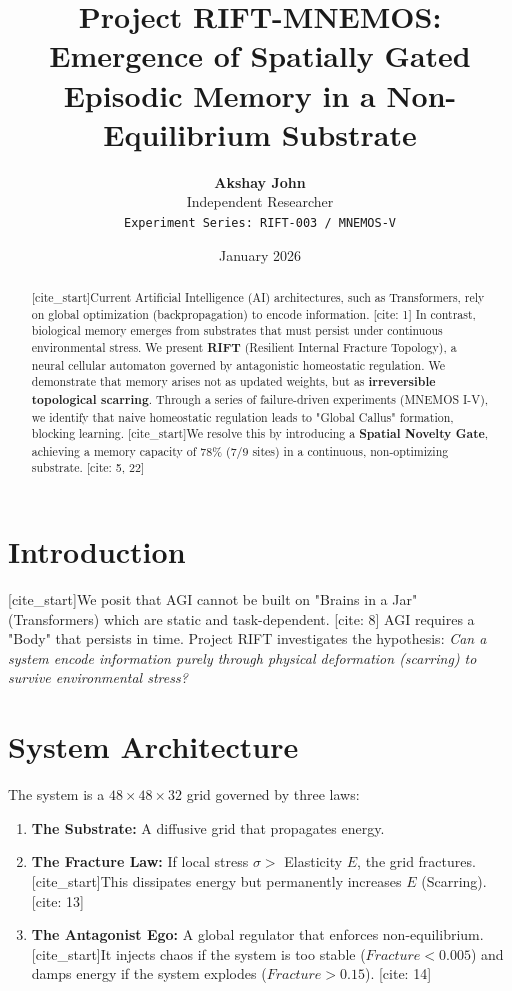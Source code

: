 \documentclass[11pt, a4paper]{article}
\title{\textbf{Project RIFT-MNEMOS:}\\
\large Emergence of Spatially Gated Episodic Memory in a Non-Equilibrium Substrate}
\author{
\textbf{Akshay John} \\
Independent Researcher \\
\texttt{Experiment Series: RIFT-003 / MNEMOS-V}
}
\date{January 2026}
\begin{document}
\maketitle

\begin{abstract}
[cite_start]Current Artificial Intelligence (AI) architectures, such as Transformers, rely on global optimization (backpropagation) to encode information. [cite: 1] In contrast, biological memory emerges from substrates that must persist under continuous environmental stress. We present \textbf{RIFT} (Resilient Internal Fracture Topology), a neural cellular automaton governed by antagonistic homeostatic regulation. We demonstrate that memory arises not as updated weights, but as \textbf{irreversible topological scarring}. Through a series of failure-driven experiments (MNEMOS I-V), we identify that naive homeostatic regulation leads to "Global Callus" formation, blocking learning. [cite_start]We resolve this by introducing a \textbf{Spatial Novelty Gate}, achieving a memory capacity of 78\% (7/9 sites) in a continuous, non-optimizing substrate. [cite: 5, 22]
\end{abstract}

\section{Introduction}
[cite_start]We posit that AGI cannot be built on "Brains in a Jar" (Transformers) which are static and task-dependent. [cite: 8] AGI requires a "Body" that persists in time. Project RIFT investigates the hypothesis: \textit{Can a system encode information purely through physical deformation (scarring) to survive environmental stress?}

\section{System Architecture}
The system is a $48 \times 48 \times 32$ grid governed by three laws:
\begin{enumerate}
    \item \textbf{The Substrate:} A diffusive grid that propagates energy.
    \item \textbf{The Fracture Law:} If local stress $\sigma >$ Elasticity $E$, the grid fractures. [cite_start]This dissipates energy but permanently increases $E$ (Scarring). [cite: 13]
    \item \textbf{The Antagonist Ego:} A global regulator that enforces non-equilibrium. [cite_start]It injects chaos if the system is too stable ($Fracture < 0.005$) and damps energy if the system explodes ($Fracture > 0.15$). [cite: 14]
\end{enumerate}
\end{document}
